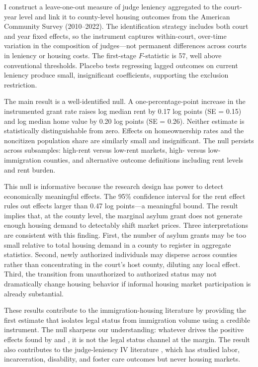 \documentclass[12pt]{article}
\begin{document}
I construct a leave-one-out measure of judge leniency aggregated to the court-year level and link it to county-level housing outcomes from the American Community Survey (2010--2022). The identification strategy includes both court and year fixed effects, so the instrument captures within-court, over-time variation in the composition of judges---not permanent differences across courts in leniency or housing costs. The first-stage $F$-statistic is 57, well above conventional thresholds. Placebo tests regressing lagged outcomes on current leniency produce small, insignificant coefficients, supporting the exclusion restriction.

The main result is a well-identified null. A one-percentage-point increase in the instrumented grant rate raises log median rent by 0.17 log points (SE = 0.15) and log median home value by 0.20 log points (SE = 0.26). Neither estimate is statistically distinguishable from zero. Effects on homeownership rates and the noncitizen population share are similarly small and insignificant. The null persists across subsamples: high-rent versus low-rent markets, high- versus low-immigration counties, and alternative outcome definitions including rent levels and rent burden.

This null is informative because the research design has power to detect economically meaningful effects. The 95\% confidence interval for the rent effect rules out effects larger than 0.47 log points---a meaningful bound. The result implies that, at the county level, the marginal asylum grant does not generate enough housing demand to detectably shift market prices. Three interpretations are consistent with this finding. First, the number of asylum grants may be too small relative to total housing demand in a county to register in aggregate statistics. Second, newly authorized individuals may disperse across counties rather than concentrating in the court's host county, diluting any local effect. Third, the transition from unauthorized to authorized status may not dramatically change housing behavior if informal housing market participation is already substantial.

These results contribute to the immigration-housing literature by providing the first estimate that isolates legal status from immigration volume using a credible instrument. The null sharpens our understanding: whatever drives the positive effects found by \citet{saiz2007} and \citet{howard2020}, it is not the legal status channel at the margin. The result also contributes to the judge-leniency IV literature \citep{mueller2022,kling2006,maestas2013,doyle2007}, which has studied labor, incarceration, disability, and foster care outcomes but never housing markets.
\end{document}
